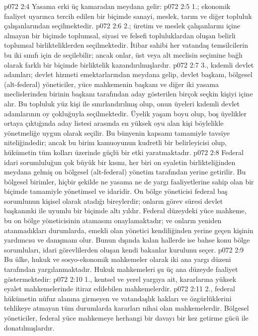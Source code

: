 \vs p072 2:4 Yasama erki üç kamaradan meydana gelir:
\vs p072 2:5 1.\bibnobreakspace {}; ekonomik faaliyet uyarınca tercih edilen bir biçimde sanayi, meslek, tarım ve diğer topluluk çalışanlarından seçilmektedir.
\vs p072 2:6 2.\bibnobreakspace {}; üretim ve meslek çalışanlarını içine almayan bir biçimde toplumsal, siyasi ve felsefi topluluklardan oluşan belirli toplumsal birlikteliklerden seçilmektedir. İtibar sahibi her vatandaş temsilcilerin bu iki sınıfı için de seçilebilir; ancak onlar, üst veya alt meclisin seçimine bağlı olarak farklı bir biçimde birliktelik kazandırılmışlardır.
\vs p072 2:7 3.\bibnobreakspace {}, kıdemli devlet adamları; devlet hizmeti emektarlarından meydana gelip, devlet başkanı, bölgesel (alt\hyp{}federal) yöneticiler, yüce mahkemenin başkanı ve diğer iki yasama meclislerinden birinin başkanı tarafından aday gösterilen birçok seçkin kişiyi içine alır. Bu topluluk yüz kişi ile sınırlandırılmış olup, onun üyeleri kıdemli devlet adamlarının oy çokluğuyla seçilmektedir. Üyelik yaşam boyu olup, boş üyelikler ortaya çıktığında aday listesi arasında en yüksek oyu alan kişi böylelikle yönetmeliğe uygun olarak seçilir. Bu bünyenin kapsamı tamamiyle tavsiye niteliğindedir; ancak bu birim kamuoyunun kudretli bir belirleyicisi olup, hükümetin tüm kolları üzerinde güçlü bir etki yaratmaktadır.
\vs p072 2:8 Federal idari sorumluluğun çok büyük bir kısmı, her biri on eyaletin birlikteliğinden meydana gelmiş on bölgesel (alt\hyp{}federal) yönetim tarafından yerine getirilir. Bu bölgesel birimler, hiçbir şekilde ne yasama ne de yargı faaliyetlerine sahip olan bir biçimde tamamiyle yönetimsel ve idaridir. On bölge yöneticisi federal baş sorumlunun kişisel olarak atadığı bireylerdir; onların görev süresi devlet başkanınki ile uyumlu bir biçimde altı yıldır. Federal düzeydeki yüce mahkeme, bu on bölge yöneticisinin atamasını onaylamaktadır; ve onların yeniden atanmadıkları durumlarda, emekli olan yönetici kendiliğinden yerine geçen kişinin yardımcısı ve danışmanı olur. Bunun dışında kalan hallerde ise bahse konu bölge sorumluları, idari görevlilerden oluşan kendi bakanlar kurulunu seçer.
\vs p072 2:9 Bu ülke, hukuk ve sosyo\hyp{}ekonomik mahkemeler olarak iki ana yargı düzeni tarafından yargılanmaktadır. Hukuk mahkemeleri şu üç ana düzeyde faaliyet göstermektedir:
\vs p072 2:10 1.\bibnobreakspace {}, kentsel ve yerel yargıya ait, kararlarına yüksek eyalet mahkemelerinde itiraz edilebilen mahkemelerdir.
\vs p072 2:11 2.\bibnobreakspace {}, federal hükümetin nüfuz alanına girmeyen ve vatandaşlık hakları ve özgürlüklerini tehlikeye atmayan tüm durumlarda kararları nihai olan mahkemelerdir. Bölgesel yöneticiler, federal yüce mahkemeye herhangi bir davayı bir kez getirme gücü ile donatılmışlardır.
